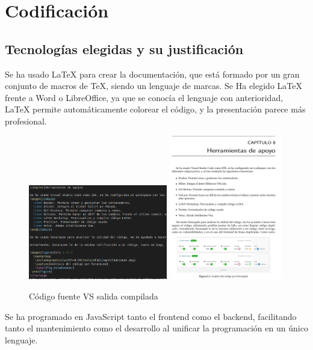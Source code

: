 \documentclass[11pt,spanish,listoffigures,listoftables]{tfgetsinf}
\begin{document}
\chapter{Codificación}

\section{Tecnologías elegidas y su justificación}

Se ha usado \LaTeX{} para crear la documentación, que está formado por un gran conjunto de macros de TeX, siendo un lenguaje de marcas. 
Se Ha elegido \LaTeX{} frente a Word o LibreOffice, ya que se conocía el lenguaje con anterioridad, \LaTeX{} permite automáticamente colorear el código, y la presentación parece más profesional.

\begin{figure}[ht!] %
  \includegraphics[width=0.54\textwidth]{img/LatexCode2.png}
  \includegraphics[width=0.44\textwidth]{img/LatexCompilado.png}
  \caption{Código fuente VS salida compilada}
  \label{fig:Latex}
\end{figure}

Se ha programado en JavaScript tanto el frontend como el backend, facilitando tanto el mantenimiento como el desarrollo al unificar la programación en un único lenguaje.
\end{document}
